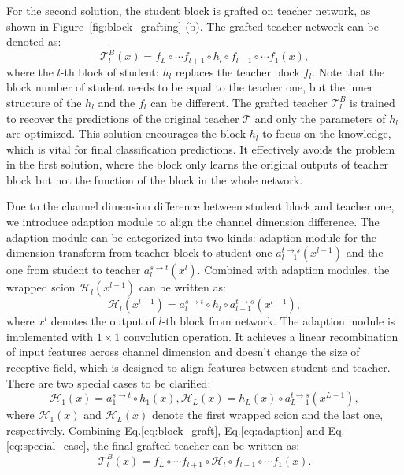\documentclass[letterpaper]{article} %
\begin{document}
{{        For the second solution, the student block is grafted on teacher network, as shown in Figure~\ref{fig:block_grafting} (b).
        The grafted teacher network can be denoted as:
        \begin{equation} \label{eq:block_graft}
            \mathcal{T}_l^B(x) = f_L \circ \cdots f_{l+1} \circ h_l \circ f_{l-1} \circ \cdots f_1(x),
        \end{equation}
        where the $l$-th block of student: $h_l$ replaces the teacher block $f_l$.
        Note that the block number of student needs to be equal to the teacher one, but the inner structure of the $h_l$ and the $f_l$ can be different.
        The grafted teacher $\mathcal{T}_l^B$ is trained to recover the predictions of the original teacher $\mathcal{T}$ and only the parameters of $h_l$ are optimized.
        This solution encourages the block $h_l$ to focus on the knowledge, which is vital for final classification predictions.
        It effectively avoids the problem in the first solution, where the block only learns the original outputs of teacher block but not the function of the block in the whole network.

        Due to the channel dimension difference between student block and teacher one, we introduce adaption module to align the channel dimension difference.
        The adaption module can be categorized into two kinds: adaption module for the dimension transform from teacher block to student one $a_{l-1}^{t \rightarrow s}(x^{l-1})$ and the one from student to teacher $a_{l}^{s \rightarrow t}(x^{l})$.
        Combined with adaption modules, the wrapped scion $\mathcal{H}_l(x^{l-1})$ can be written as:
        \begin{equation} \label{eq:adaption}
            \mathcal{H}_l(x^{l-1}) = a_{l}^{s \rightarrow t}\circ h_l \circ a_{l-1}^{t \rightarrow s}(x^{l-1}),
        \end{equation}
        where $x^l$ denotes the output of $l$-th block from network.
        The adaption module is implemented with $1 \times 1$ convolution operation.
        It achieves a linear recombination of input features across channel dimension and doesn't change the size of receptive field, which is designed to align features between student and teacher.
        There are two special cases to be clarified:
        \begin{equation} \label{eq:special_case}
            \mathcal{H}_1(x) = a_{1}^{s \rightarrow t}\circ h_1(x),
            \mathcal{H}_L(x) = h_L(x) \circ a_{L-1}^{t \rightarrow s}(x^{L-1}),
        \end{equation}
        where $\mathcal{H}_1(x)$ and $\mathcal{H}_L(x)$ denote the first wrapped scion and the last one, respectively.
        Combining Eq.\ref{eq:block_graft}, Eq.\ref{eq:adaption} and Eq.\ref{eq:special_case}, the final grafted teacher can be written as:
        \begin{equation} \label{eq:final_block_graft}
            \mathcal{T}_l^B(x) = f_L \circ \cdots f_{l+1} \circ \mathcal{H}_l \circ f_{l-1} \circ \cdots f_1(x).
        \end{equation}


}}
\end{document}
